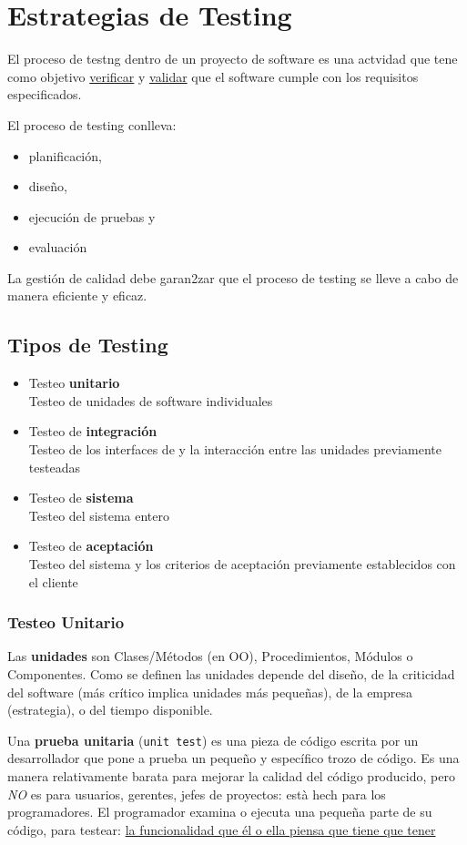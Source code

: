 \chapter{Estrategias de Testing}
\label{chap:estrategias-de-testing}

El proceso de testng dentro de un proyecto de software es una actvidad que tene como objetivo \ul{verificar} y \ul{validar} que el software cumple con los requisitos especificados.

El proceso de testing conlleva:
\begin{itemize}
	\item planificación,
	\item diseño,
	\item ejecución de pruebas y
	\item evaluación
\end{itemize}
La gestión de calidad debe garan2zar que el proceso de
testing se lleve a cabo de manera eficiente y eficaz.

\section{Tipos de Testing}
\begin{itemize}
	\item Testeo \textbf{unitario}\\
   Testeo de unidades de software individuales
	\item Testeo de \textbf{integración}\\
   Testeo de los interfaces de y la interacción entre las unidades previamente testeadas
	\item Testeo de \textbf{sistema}\\
   Testeo del sistema entero
	\item Testeo de \textbf{aceptación}\\
   Testeo del sistema y los criterios de aceptación previamente establecidos con el cliente
\end{itemize}

\subsection{Testeo Unitario}
Las \textbf{unidades} son Clases/Métodos (en OO), Procedimientos, Módulos o Componentes. Como se definen las unidades depende del diseño, de la criticidad del software (más crítico implica unidades más pequeñas), de la empresa (estrategia), o del tiempo disponible.


Una \textbf{prueba unitaria} (\texttt{unit test}) es una pieza de código escrita por un desarrollador que pone a prueba un pequeño y específico trozo de código.
Es una manera relativamente barata para mejorar la calidad del código producido, pero \textit{NO} es para usuarios, gerentes, jefes de proyectos: està hech para los programadores.
El programador examina o ejecuta una pequeña
parte de su código, para testear:
\ul{la funcionalidad que él o ella piensa que tiene que tener}

